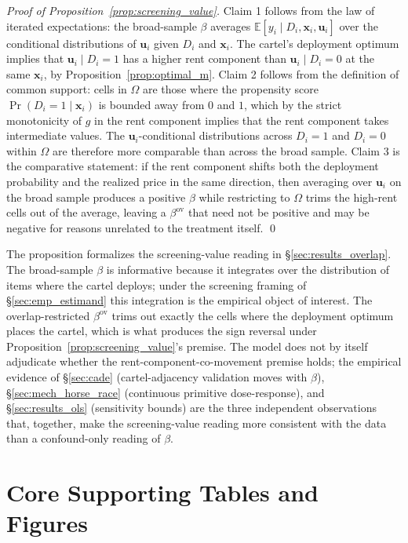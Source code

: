 \begin{proof}[Proof of Proposition~\ref{prop:screening_value}]
Claim 1 follows from the law of iterated expectations: the
broad-sample $\beta$ averages $\mathbb{E}[y_i \mid D_i,
\mathbf{x}_i, \mathbf{u}_i]$ over the conditional distributions
of $\mathbf{u}_i$ given $D_i$ and $\mathbf{x}_i$. The cartel's
deployment optimum implies that $\mathbf{u}_i \mid D_i=1$ has a
higher rent component than $\mathbf{u}_i \mid D_i=0$ at the same
$\mathbf{x}_i$, by Proposition~\ref{prop:optimal_m}. Claim 2
follows from the definition of common support: cells in $\Omega$
are those where the propensity score
$\Pr(D_i=1 \mid \mathbf{x}_i)$ is bounded away from $0$ and $1$,
which by the strict monotonicity of $g$ in the rent component
implies that the rent component takes intermediate values. The
$\mathbf{u}_i$-conditional distributions across $D_i=1$ and
$D_i=0$ within $\Omega$ are therefore more comparable than across
the broad sample. Claim 3 is the comparative statement: if the
rent component shifts both the deployment probability and the
realized price in the same direction, then averaging over
$\mathbf{u}_i$ on the broad sample produces a positive
$\beta$ while restricting to $\Omega$ trims the high-rent cells
out of the average, leaving a $\beta^{\text{ov}}$ that need not
be positive and may be negative for reasons unrelated to the
treatment itself. \qed
\end{proof}

The proposition formalizes the screening-value reading in
§\ref{sec:results_overlap}. The broad-sample $\beta$ is
informative because it integrates over the distribution of
items where the cartel deploys; under the screening framing of
§\ref{sec:emp_estimand} this integration is the empirical object
of interest. The overlap-restricted $\beta^{\text{ov}}$ trims
out exactly the cells where the deployment optimum places the
cartel, which is what produces the sign reversal under
Proposition~\ref{prop:screening_value}'s premise. The model does
not by itself adjudicate whether the rent-component-co-movement
premise holds; the empirical evidence of §\ref{sec:cade}
(cartel-adjacency validation moves with $\beta$),
§\ref{sec:mech_horse_race} (continuous primitive dose-response),
and §\ref{sec:results_ols} (sensitivity bounds) are the three
independent observations that, together, make the screening-value
reading more consistent with the data than a confound-only
reading of $\beta$.

\section{Core Supporting Tables and Figures}
\label{app:supporting}

